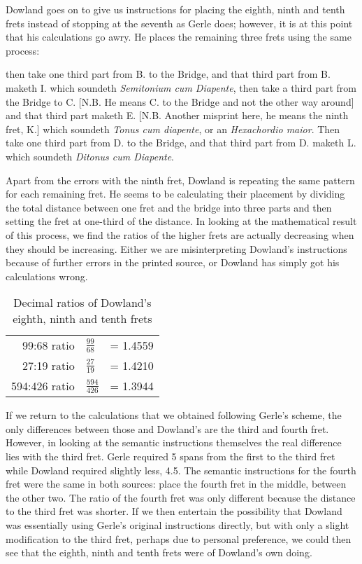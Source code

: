 Dowland goes on to give us instructions for placing the eighth, ninth and tenth frets
instead of stopping at the seventh as Gerle does; however, it is at this point that his
calculations go awry. He places the remaining three frets using the same process:
\begin{blocks}
then take one third part from B. to the Bridge, and that third part from B. maketh I.
which soundeth \emph{Semitonium cum Diapente}, then take a third part from the Bridge
to C. [N.B. He means C. to the Bridge and not the other way around] and that third part
maketh E. [N.B. Another misprint here, he means the ninth fret, K.] which soundeth
\emph{Tonus cum diapente}, or an \emph{Hexachordio maior}. Then take one third part
from D. to the Bridge, and that third part from D. maketh L. which soundeth
\emph{Ditonus cum Diapente}.
\end{blocks}
Apart from the errors with the ninth fret, Dowland is repeating the same pattern for
each remaining fret. He seems to be calculating their placement by dividing the
total distance between one fret and the bridge into three parts and then setting the
fret at one-third of the distance. In looking at the mathematical result of
this process, we find the ratios of the higher frets are actually decreasing when they
should be increasing. Either we are misinterpreting Dowland's instructions because of
further errors in the printed source, or Dowland has simply got his calculations wrong.

\begin{table}[h!]
  \begin{center}
  \begin{tabular}{ r l l }
    99:68 ratio  & $ \frac{99}{68}  $ & = 1.4559 \\
    27:19 ratio  & $ \frac{27}{19}  $ & = 1.4210 \\
    594:426 ratio & $ \frac{594}{426} $ & = 1.3944 \\
  \end{tabular}
  \end{center}
  \caption{Decimal ratios of Dowland's eighth, ninth and tenth frets}
\end{table}

If we return to the calculations that we obtained following Gerle's scheme, the only differences between those and
Dowland's are the third and fourth fret. However, in looking at the semantic instructions themselves the real difference
lies with the third fret. Gerle required 5 spans from the first to the third fret while Dowland required slightly less,
4.5. The semantic instructions for the fourth fret were the same in both sources: place the fourth fret in the middle,
between the other two. The ratio of the fourth fret was only different because the distance to the third fret was
shorter.  If we then entertain the possibility that Dowland was essentially using Gerle's original instructions
directly, but with only a slight modification to the third fret, perhaps due to personal preference, we could then see
that the eighth, ninth and tenth frets were of Dowland's own doing.


